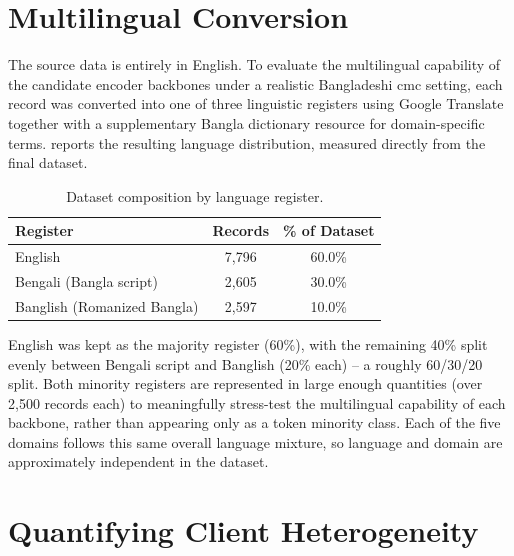 \section{Multilingual Conversion}
\label{sec:dataset-multilingual}

The source data is entirely in English. To evaluate the multilingual capability of the candidate encoder backbones under a realistic Bangladeshi \gls{cmc} setting, each record was converted into one of three linguistic registers using Google Translate together with a supplementary Bangla dictionary resource for domain-specific terms.  reports the resulting language distribution, measured directly from the final dataset.

\begin{table}[htbp]
\centering
\caption{Dataset composition by language register.}
\label{tab:dataset-language}
\begin{tabular}{@{}lcc@{}}
\toprule
\textbf{Register} & \textbf{Records} & \textbf{\% of Dataset} \\
\midrule
English  & 7{,}796 & 60.0\% \\
Bengali (Bangla script)  & 2{,}605 & 30.0\% \\
Banglish (Romanized Bangla) & 2{,}597 & 10.0\% \\
\bottomrule
\end{tabular}
\end{table}

English was kept as the majority register (60\%), with the remaining 40\% split evenly between Bengali script and Banglish (20\% each) -- a roughly 60/30/20 split. Both minority registers are represented in large enough quantities (over 2{,}500 records each) to meaningfully stress-test the multilingual capability of each backbone, rather than appearing only as a token minority class. Each of the five domains follows this same overall language mixture, so language and domain are approximately independent in the dataset.

\section{Quantifying Client Heterogeneity}
\label{sec:dataset-heterogeneity}

